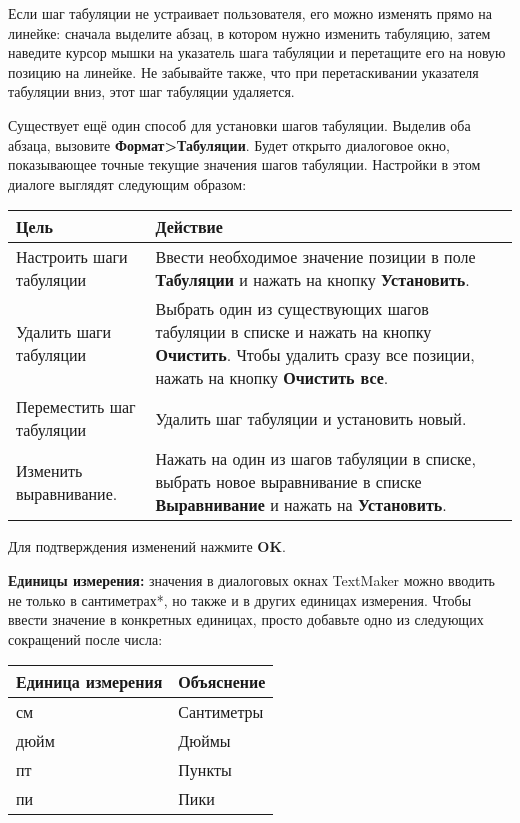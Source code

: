 ﻿\documentclass[a4paper,10pt]{article}
\begin{document}
Если шаг табуляции не устраивает пользователя, его можно изменять прямо на линейке: сначала выделите абзац, в котором нужно изменить табуляцию, затем наведите курсор мышки на указатель шага табуляции и перетащите его на новую позицию на линейке. Не забывайте также, что при перетаскивании указателя табуляции вниз, этот шаг табуляции удаляется.

Существует ещё один способ для установки шагов табуляции. Выделив оба абзаца, вызовите \textbf{Формат>Табуляции}. Будет открыто диалоговое окно, показывающее точные текущие значения шагов табуляции. Настройки в этом диалоге выглядят следующим образом:

\begin{center}
\begin{tabular}{ | m{6cm} | m{6cm} | }
\hline
 \textbf{Цель} & \textbf{Действие} \\ 
 \hline
 Настроить шаги табуляции & Ввести необходимое значение позиции в поле \textbf{Табуляции} и нажать на кнопку \textbf{Установить}.\\
\hline
Удалить шаги табуляции & Выбрать один из существующих шагов табуляции в списке и нажать на кнопку \textbf{Очистить}. Чтобы удалить сразу все позиции, нажать на кнопку \textbf{Очистить все}. \\
\hline
Переместить шаг табуляции & Удалить шаг табуляции и установить новый. \\
\hline
Изменить выравнивание. & Нажать на один из шагов табуляции в списке, выбрать новое выравнивание в списке \textbf{Выравнивание} и нажать на \textbf{Установить}.\\
\hline
\end{tabular}
\end{center}

Для подтверждения изменений нажмите \textbf{OK}.

\textbf{Единицы измерения:} значения в диалоговых окнах TextMaker можно вводить не только в сантиметрах*, но также и в других единицах измерения. Чтобы ввести значение в конкретных единицах, просто добавьте одно из следующих сокращений после числа:

\begin{center}
\begin{tabular}{ | m{4cm} | m{4cm} | }
\hline
 \textbf{Единица измерения} & \textbf{Объяснение} \\ 
 \hline
 см & Сантиметры\\
\hline
дюйм & Дюймы\\
\hline
пт & Пункты \\
\hline
пи & Пики\\
\hline
\end{tabular}
\end{center}
\end{document}
